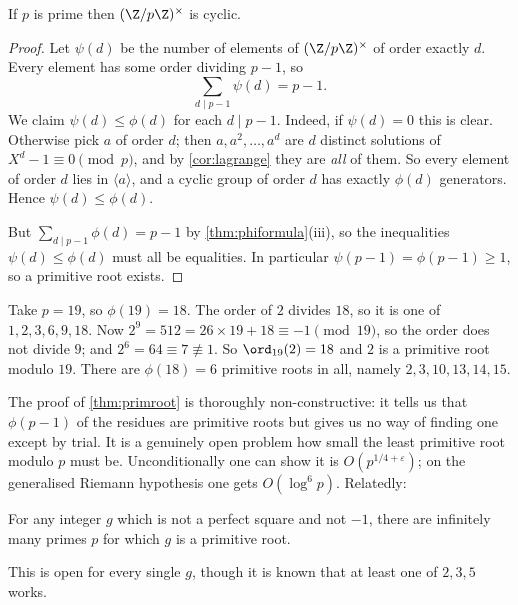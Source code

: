 \begin{theorem}\label{thm:primroot}
	If $p$ is prime then $(\Z/p\Z)^\times$ is cyclic.
\end{theorem}
\begin{proof}
	Let $\psi(d)$ be the number of elements of $(\Z/p\Z)^\times$ of order exactly $d$. Every element has some order dividing $p - 1$, so
	$$
	\sum_{d \mid p - 1} \psi(d) = p - 1.
	$$
	We claim $\psi(d) \leq \phi(d)$ for each $d \mid p-1$. Indeed, if $\psi(d) = 0$ this is clear. Otherwise pick $a$ of order $d$; then $a, a^2, \dots, a^d$ are $d$ distinct solutions of $X^d - 1 \equiv 0 \pmod p$, and by \autoref{cor:lagrange} they are \emph{all} of them. So every element of order $d$ lies in $\langle a \rangle$, and a cyclic group of order $d$ has exactly $\phi(d)$ generators. Hence $\psi(d) \leq \phi(d)$.

	But $\sum_{d \mid p-1}\phi(d) = p - 1$ by \autoref{thm:phiformula}(iii), so the inequalities $\psi(d) \leq \phi(d)$ must all be equalities. In particular $\psi(p-1) = \phi(p-1) \geq 1$, so a primitive root exists.
\end{proof}

\begin{example}
	Take $p = 19$, so $\phi(19) = 18$. The order of $2$ divides $18$, so it is one of $1, 2, 3, 6, 9, 18$. Now $2^9 = 512 = 26 \times 19 + 18 \equiv -1 \pmod{19}$, so the order does not divide $9$; and $2^6 = 64 \equiv 7 \not\equiv 1$. So $\ord_{19}(2) = 18$ and $2$ is a primitive root modulo $19$. There are $\phi(18) = 6$ primitive roots in all, namely $2, 3, 10, 13, 14, 15$.
\end{example}

\begin{remark}
	The proof of \autoref{thm:primroot} is thoroughly non-constructive: it tells us that $\phi(p-1)$ of the residues are primitive roots but gives us no way of finding one except by trial. It is a genuinely open problem how small the least primitive root modulo $p$ must be. Unconditionally one can show it is $O(p^{1/4 + \varepsilon})$; on the generalised Riemann hypothesis one gets $O(\log^6 p)$. Relatedly:
\end{remark}

\begin{conjecture}[Artin]
	For any integer $g$ which is not a perfect square and not $-1$, there are infinitely many primes $p$ for which $g$ is a primitive root.
\end{conjecture}

This is open for every single $g$, though it is known that at least one of $2, 3, 5$ works.

